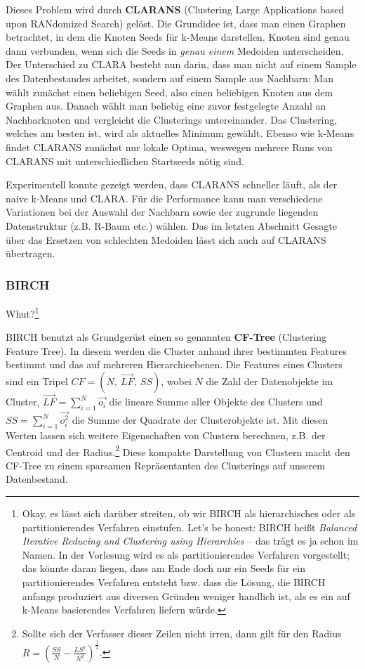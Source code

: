 Dieses Problem wird durch \textbf{CLARANS} (Clustering Large
Applications based upon RANdomized Search) gelöst. Die Grundidee
ist, dass man einen Graphen betrachtet, in dem die Knoten Seeds
für k-Means darstellen. Knoten sind genau dann verbunden, wenn
sich die Seeds in \textit{genau einem} Medoiden unterscheiden.
Der Unterschied zu CLARA besteht nun darin, dass man nicht auf einem
Sample des Datenbestandes arbeitet, sondern auf einem Sample aus
Nachbarn: Man wählt zunächst einen beliebigen Seed, also einen 
beliebigen Knoten aus dem Graphen aus. Danach wählt man beliebig eine
zuvor festgelegte Anzahl an Nachbarknoten und vergleicht die Clusterings
untereinander. Das Clustering, welches am besten ist, wird als aktuelles
Minimum gewählt. Ebenso wie k-Means findet CLARANS zunächst nur 
lokale Optima, weswegen mehrere Runs von CLARANS mit unterschiedlichen
Startseeds nötig sind. 

Experimentell konnte gezeigt werden, dass CLARANS schneller läuft,
als der naive k-Means und CLARA. Für die Performance kann man
verschiedene Variationen bei der Auswahl der Nachbarn sowie der
zugrunde liegenden Datenstruktur (z.B. R-Baum etc.) wählen. Das im
letzten Abschnitt Gesagte über das Ersetzen von schlechten Medoiden
lässt sich auch auf CLARANS übertragen.

\subsubsection{BIRCH}
Whut?\footnote{Okay, es lässt sich darüber streiten, ob wir BIRCH als
hierarchisches
oder als partitionierendes Verfahren einstufen. Let's be honest: BIRCH
heißt \textit{Balanced Iterative Reducing and Clustering using Hierarchies}
-- das trägt es ja schon im Namen. In der Vorlesung wird es als
partitionierendes Verfahren vorgestellt; das könnte daran liegen, dass
am Ende doch nur ein Seeds für ein partitionierendes Verfahren entsteht 
bzw. dass die Lösung, die BIRCH anfangs produziert aus diversen
Gründen weniger handlich ist, als es ein auf k-Means basierendes Verfahren
liefern würde.}

\noindent BIRCH benutzt als Grundgerüst einen so genannten
\textbf{CF-Tree} (Clustering Feature Tree). In diesem werden die
Cluster anhand ihrer bestimmten Features bestimmt und das auf
mehreren Hierarchieebenen. Die Features eines Clusters sind ein
Tripel \(CF=(N,\ \vec{LF},\ SS)\), wobei \(N\) die Zahl der 
Datenobjekte im Cluster, \(\vec{LF} = \sum\nolimits_{i=1}^N
\vec{o_i}\) die lineare Summe aller Objekte des Clusters und 
\(SS=\sum\nolimits_{i=1}^N
\vec{o_{i}^2}\) die Summe der Quadrate der Clusterobjekte ist.
Mit diesen Werten lassen sich weitere Eigenschaften von Clustern
berechnen, z.B. der Centroid und der Radius.\footnote{Sollte sich der
Verfasser dieser Zeilen nicht irren, dann gilt
für den Radius \(R = \left(\frac{SS}{N}-\frac{LS^2}{N^2}\right)^{\frac{1}{2}}\).}
Diese kompakte 
Darstellung von Clustern macht den CF-Tree zu einem sparsamen
Repräsentanten des Clusterings auf unserem Datenbestand. 

